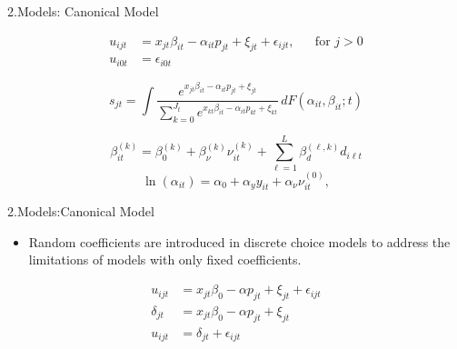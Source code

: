 \documentclass[aspectratio=169]{beamer}  %
\begin{document}
\begin{frame}{2.Models: Canonical Model}
    \begin{center}
        \begin{align}
            u_{ijt} &= x_{jt} \beta_{it} - \alpha_{it} p_{jt} + \xi_{jt} + \epsilon_{ijt}, && \text{for } j > 0 \tag{2.4} \\
            u_{i0t} &= \epsilon_{i0t} \tag{2.5}
        \end{align}

        \vspace{1em}

        \begin{equation}
            s_{jt} = \int \frac{e^{x_{jt} \beta_{it} - \alpha_{it} p_{jt} + \xi_{jt}}}{\sum_{k=0}^{J_t} e^{x_{kt} \beta_{it} - \alpha_{it} p_{kt} + \xi_{kt}}} \, dF(\alpha_{it}, \beta_{it}; t)
            \tag{2.6}
        \end{equation}

        \vspace{1em}

        \begin{equation}
            \beta_{it}^{(k)} = \beta_0^{(k)} + \beta_{\nu}^{(k)} \nu_{it}^{(k)} + \sum_{\ell=1}^{L} \beta_{d}^{(\ell, k)} d_{i \ell t}
            \tag{2.7}
        \end{equation}
        \begin{equation}
            \ln(\alpha_{it}) = \alpha_0 + \alpha_y y_{it} + \alpha_{\nu} \nu_{it}^{(0)}\tag{2.8},
        \end{equation}
    \end{center}
\end{frame}

\begin{frame}{2.Models:Canonical Model}
    \begin{itemize}
    \item Random coefficients are introduced in discrete choice models to address the limitations of models with only fixed coefficients.
     \end{itemize}
        \begin{align}
u_{ijt} &= x_{jt} \beta_0 - \alpha p_{jt} + \xi_{jt} + \epsilon_{ijt} \tag{2.9} \\
\delta_{jt} &= x_{jt} \beta_0 - \alpha p_{jt} + \xi_{jt} \tag{2.10} \\
u_{ijt} &= \delta_{jt} + \epsilon_{ijt} \tag{2.11}
\end{align}
\end{frame}
\end{document}
